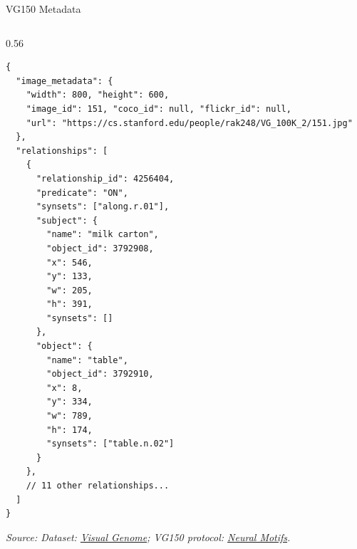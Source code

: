 \documentclass[aspectratio=1610]{beamer}
\begin{document}
\begin{frame}[fragile,shrink=4]{VG150 Metadata}
\begin{columns}[T]
    \begin{column}{0.56\textwidth}
        \vspace*{0pt}
        \vspace*{-1.8em} %
        \fontsize{4.2pt}{5.0pt}\selectfont
\begin{verbatim}
{
  "image_metadata": {
    "width": 800, "height": 600, 
    "image_id": 151, "coco_id": null, "flickr_id": null,
    "url": "https://cs.stanford.edu/people/rak248/VG_100K_2/151.jpg"
  },
  "relationships": [
    {
      "relationship_id": 4256404, 
      "predicate": "ON", 
      "synsets": ["along.r.01"],
      "subject": {
        "name": "milk carton", 
        "object_id": 3792908, 
        "x": 546, 
        "y": 133, 
        "w": 205, 
        "h": 391, 
        "synsets": []
      },
      "object": {
        "name": "table", 
        "object_id": 3792910, 
        "x": 8, 
        "y": 334, 
        "w": 789, 
        "h": 174, 
        "synsets": ["table.n.02"]
      }
    },
    // 11 other relationships...
  ]
}
\end{verbatim}
        
        \vspace{-0.5em}
        
        \fontsize{4pt}{5pt}\selectfont
        \textit{Source: Dataset: \href{https://link.springer.com/article/10.1007/s11263-016-0981-7}{Visual Genome}; VG150 protocol: \href{https://openaccess.thecvf.com/content_cvpr_2018/html/Zellers_Neural_Motifs_Scene_CVPR_2018_paper.html}{Neural Motifs}.}
    \end{column}
    
\end{columns}
\end{frame}
\end{document}
